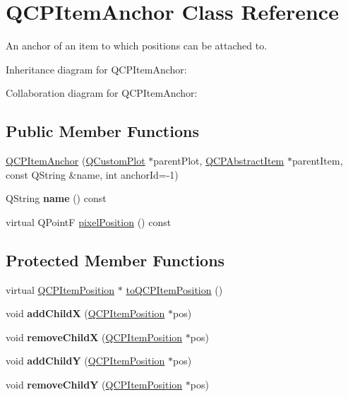 \hypertarget{classQCPItemAnchor}{}\section{Q\+C\+P\+Item\+Anchor Class Reference}
\label{classQCPItemAnchor}


An anchor of an item to which positions can be attached to.  




Inheritance diagram for Q\+C\+P\+Item\+Anchor\+:


Collaboration diagram for Q\+C\+P\+Item\+Anchor\+:
\subsection*{Public Member Functions}
\begin{DoxyCompactItemize}
\item 
\hyperlink{classQCPItemAnchor_a32573023c6fa65b4496f1f995e5bfa5f}{Q\+C\+P\+Item\+Anchor} (\hyperlink{classQCustomPlot}{Q\+Custom\+Plot} $\ast$parent\+Plot, \hyperlink{classQCPAbstractItem}{Q\+C\+P\+Abstract\+Item} $\ast$parent\+Item, const Q\+String \&name, int anchor\+Id=-\/1)
\item 
\mbox{\label{classQCPItemAnchor_aad37cdf5a3f63428f61be739014e212e}} 
Q\+String {\bfseries name} () const
\item 
virtual Q\+PointF \hyperlink{classQCPItemAnchor_a06dcfb7220d26eee93eef56ae66582cb}{pixel\+Position} () const
\end{DoxyCompactItemize}
\subsection*{Protected Member Functions}
\begin{DoxyCompactItemize}
\item 
virtual \hyperlink{classQCPItemPosition}{Q\+C\+P\+Item\+Position} $\ast$ \hyperlink{classQCPItemAnchor_ac54b20120669950255a63587193dbb86}{to\+Q\+C\+P\+Item\+Position} ()
\item 
\mbox{\label{classQCPItemAnchor_aef15daa640debfb11b0aeaa2116c6fbc}} 
void {\bfseries add\+ChildX} (\hyperlink{classQCPItemPosition}{Q\+C\+P\+Item\+Position} $\ast$pos)
\item 
\mbox{\label{classQCPItemAnchor_a230b1d494cda63458e289bbe1b642599}} 
void {\bfseries remove\+ChildX} (\hyperlink{classQCPItemPosition}{Q\+C\+P\+Item\+Position} $\ast$pos)
\item 
\mbox{\label{classQCPItemAnchor_af05dc56f24536f0c7a9a0f57b58cea67}} 
void {\bfseries add\+ChildY} (\hyperlink{classQCPItemPosition}{Q\+C\+P\+Item\+Position} $\ast$pos)
\item 
\mbox{\label{classQCPItemAnchor_aa2394911d8fff3bd958b9f4f1994b64d}} 
void {\bfseries remove\+ChildY} (\hyperlink{classQCPItemPosition}{Q\+C\+P\+Item\+Position} $\ast$pos)
\end{DoxyCompactItemize}
